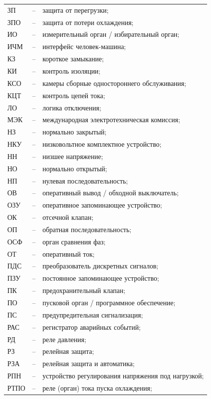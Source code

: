 \begin{longtable}{>{\raggedright\arraybackslash}m{2cm}>{\raggedright\arraybackslash}m{0.5cm}>{\raggedright\arraybackslash}m{20cm}}
ЗП & -- & защита от перегрузки; \\
ЗПО & -- & защита от потери охлаждения; \\
ИО & -- & измерительный орган / избирательный орган; \\
ИЧМ & -- & интерфейс человек-машина; \\
КЗ & -- & короткое замыкание; \\
КИ & -- & контроль изоляции; \\
КСО & -- & камеры сборные одностороннего обслуживания; \\
КЦТ & -- & контроль цепей тока; \\
ЛО & -- & логика отключения; \\
МЭК & -- & международная электротехническая комиссия; \\
НЗ & -- & нормально закрытый; \\
НКУ & -- & низковольтное комплектное устройство; \\
НН & -- & низшее напряжение; \\
НО & -- & нормально открытый; \\
НП & -- & нулевая последовательность; \\
ОВ & -- & оперативный вывод / обходной выключатель; \\
ОЗУ & -- & оперативное запоминающее устройство; \\
ОК & -- & отсечной клапан; \\
ОП & -- & обратная последовательность; \\
ОСФ & -- & орган сравнения фаз; \\
ОТ & -- & оперативный ток; \\
ПДС & -- & преобразователь дискретных сигналов; \\
ПЗУ & -- & постоянное запоминающее устройство; \\
ПК & -- & предохранительный клапан; \\
ПО & -- & пусковой орган / программное обеспечение; \\
ПС & -- & предупредительная сигнализация; \\
РАС & -- & регистратор аварийных событий; \\
РД & -- & реле давления; \\
РЗ & -- & релейная защита; \\
РЗА & -- & релейная защита и автоматика; \\
РПН & -- & устройство регулирования напряжения под нагрузкой; \\
РТПО & -- & реле (орган) тока пуска охлаждения; \\

\end{longtable}
